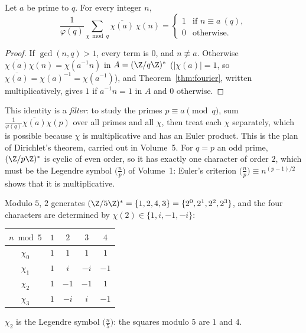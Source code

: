\begin{proposition}\label{prop:dirichletorth}
Let $a$ be prime to $q$. For every integer $n$,
\[
\frac1{\varphi(q)}\sum_{\chi\bmod q}\overline{\chi(a)}\,\chi(n)=\begin{cases}1&\text{if }n\equiv a\ (q),\\0&\text{otherwise.}\end{cases}
\]
\end{proposition}
\begin{proof}
If $\gcd(n,q)>1$, every term is $0$, and $n\not\equiv a$. Otherwise $\overline{\chi(a)}\chi(n)=\chi(a^{-1}n)$ in $A=(\Z/q\Z)^*$ ($|\chi(a)|=1$, so $\overline{\chi(a)}=\chi(a)^{-1}=\chi(a^{-1})$), and Theorem~\ref{thm:fourier}, written multiplicatively, gives $1$ if $a^{-1}n=1$ in $A$ and $0$ otherwise.
\end{proof}

This identity is a \emph{filter}: to study the primes $p\equiv a\pmod q$, sum $\frac1{\varphi(q)}\overline{\chi(a)}\chi(p)$ over all primes and all $\chi$, then treat each $\chi$ separately, which is possible because $\chi$ is multiplicative and has an Euler product. This is the plan of Dirichlet's theorem, carried out in Volume~5. For $q=p$ an odd prime, $(\Z/p\Z)^*$ is cyclic of even order, so it has exactly one character of order $2$, which must be the Legendre symbol $\bigl(\frac np\bigr)$ of Volume~1: Euler's criterion $\bigl(\frac np\bigr)\equiv n^{(p-1)/2}$ shows that it is multiplicative.

\begin{example}\label{ex:dir5}
Modulo $5$, $2$ generates $(\Z/5\Z)^*=\{1,2,4,3\}=\{2^0,2^1,2^2,2^3\}$, and the four characters are determined by $\chi(2)\in\{1,i,-1,-i\}$:
\begin{center}
\small
\begin{tabular}{c|cccc}
$n\bmod5$ & $1$ & $2$ & $3$ & $4$\\\hline
$\chi_0$ & $1$ & $1$ & $1$ & $1$\\
$\chi_1$ & $1$ & $i$ & $-i$ & $-1$\\
$\chi_2$ & $1$ & $-1$ & $-1$ & $1$\\
$\chi_3$ & $1$ & $-i$ & $i$ & $-1$
\end{tabular}
\end{center}
$\chi_2$ is the Legendre symbol $\bigl(\frac n5\bigr)$: the squares modulo $5$ are $1$ and $4$.
\end{example}

